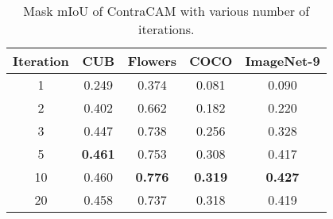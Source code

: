 \begin{table}[h]
\centering\small
\caption{
Mask mIoU of ContraCAM with various number of iterations.
}\label{tab:loc-iter}
\begin{tabular}{ccccc}
\toprule
Iteration & CUB & Flowers & COCO & ImageNet-9 \\
\midrule
1  & 0.249 & 0.374 & 0.081 & 0.090 \\
2  & 0.402 & 0.662 & 0.182 & 0.220 \\
3  & 0.447 & 0.738 & 0.256 & 0.328 \\
5  & \textbf{0.461} & 0.753 & 0.308 & 0.417 \\
10 & 0.460 & \textbf{0.776} & \textbf{0.319} & \textbf{0.427} \\
20 & 0.458 & 0.737 & 0.318 & 0.419 \\
\bottomrule
\end{tabular}
\end{table}
